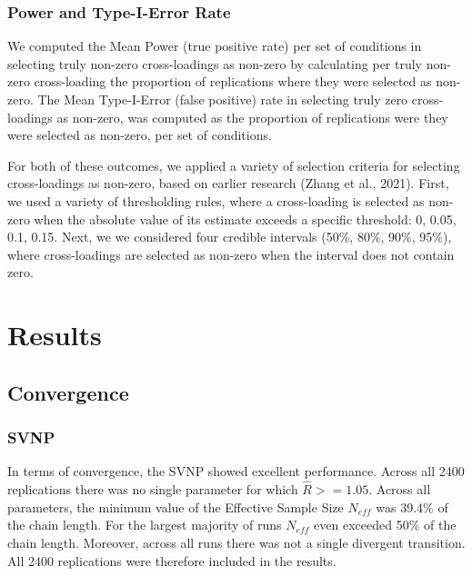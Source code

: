 \documentclass[
  man, donotrepeattitle,floatsintext]{apa6}
\begin{document}
\hypertarget{power-and-type-i-error-rate}{%
\subsubsection{Power and Type-I-Error Rate}\label{power-and-type-i-error-rate}}

We computed the Mean Power (true positive rate) per set of conditions in selecting truly non-zero cross-loadings as non-zero by calculating per truly non-zero cross-loading the proportion of replications where they were selected as non-zero. The Mean Type-I-Error (false positive) rate in selecting truly zero cross-loadings as non-zero, was computed as the proportion of replications were they were selected as non-zero, per set of conditions.

For both of these outcomes, we applied a variety of selection criteria for selecting cross-loadings as non-zero, based on earlier research (Zhang et al., 2021). First, we used a variety of thresholding rules, where a cross-loading is selected as non-zero when the absolute value of its estimate exceeds a specific threshold: 0, 0.05, 0.1, 0.15. Next, we we considered four credible intervals (50\%, 80\%, 90\%, 95\%), where cross-loadings are selected as non-zero when the interval does not contain zero.

\hypertarget{results}{%
\section{Results}\label{results}}

\hypertarget{convergence}{%
\subsection{Convergence}\label{convergence}}

\hypertarget{svnp}{%
\subsubsection{SVNP}\label{svnp}}

In terms of convergence, the SVNP showed excellent performance. Across all 2400 replications there was no single parameter for which \(\hat{R} >= 1.05\). Across all parameters, the minimum value of the Effective Sample Size \(N_{eff}\) was 39.4\% of the chain length. For the largest majority of runs \(N_{eff}\) even exceeded 50\% of the chain length. Moreover, across all runs there was not a single divergent transition. All 2400 replications were therefore included in the results.
\end{document}
